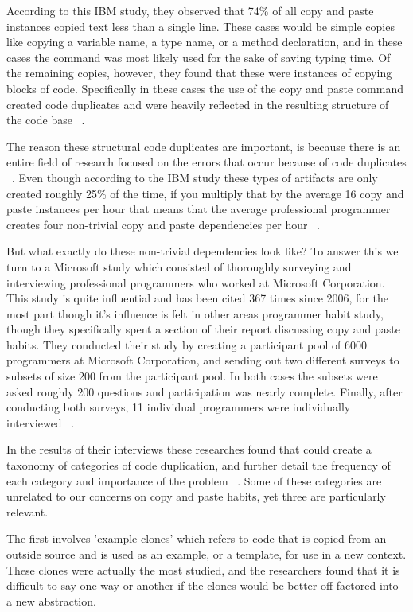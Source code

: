 \documentclass{acm_proc_article-sp}
\begin{document}
According to this IBM study, they observed that 74\% of all copy and paste instances copied text less than a single line. These cases would be simple copies like copying a variable name, a type name, or a method declaration, and in these cases the command was most likely used for the sake of saving typing time. Of the remaining copies, however, they found that these were instances of copying blocks of code. Specifically in these cases the use of the copy and paste command created code duplicates and were heavily reflected in the resulting structure of the code base ~\cite{ooplCP}.

The reason these structural code duplicates are important, is because there is an entire field of research focused on the errors that occur because of code duplicates ~\cite{devWorkHabits}. Even though according to the IBM study these types of artifacts are only created roughly 25\% of the time, if you multiply that by the average 16 copy and paste instances per hour that means that the average professional programmer creates four non-trivial copy and paste dependencies per hour ~\cite{ooplCP}. 

But what exactly do these non-trivial dependencies look like? To answer this we turn to a Microsoft study which consisted of thoroughly surveying and interviewing professional programmers who worked at Microsoft Corporation. This study is quite influential and has been cited 367 times since 2006, for the most part though it's influence is felt in other areas programmer habit study, though they specifically spent a section of their report discussing copy and paste habits. They conducted their study by creating a participant pool of 6000 programmers at Microsoft Corporation, and sending out two different surveys to subsets of size 200 from the participant pool. In both cases the subsets were asked roughly 200 questions and participation was nearly complete. Finally, after conducting both surveys, 11 individual programmers were individually interviewed ~\cite{devWorkHabits}. 

In the results of their interviews these researches found that could create a taxonomy of categories of code duplication, and further detail the frequency of each category and importance of the problem ~\cite{devWorkHabits}. Some of these categories are unrelated to our concerns on copy and paste habits, yet three are particularly relevant.

The first involves 'example clones' which refers to code that is copied from an outside source and is used as an example, or a template, for use in a new context. These clones were actually the most studied, and the researchers found that it is difficult to say one way or another if the clones would be better off factored into a new abstraction. 
\end{document}
